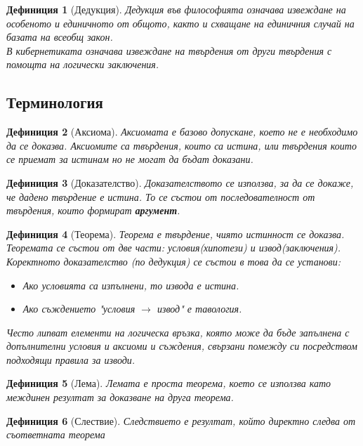 \documentclass[fleqn, 12pt]{article}
\newtheorem{definition}{Дефиниция}[subsection]
\begin{document}
\begin{definition}[Дедукция]
Дедукция във философията означава извеждане на особеното и единичното от общото, както и схващане на единичния случай на базата на всеобщ закон. \\
В кибернетиката означава извеждане на твърдения от други твърдения с помощта на логически заключения.
\end{definition}

\subsection{Терминология}

\begin{definition}[Аксиома]
Аксиомата е базово допускане, което не е необходимо да се доказва. 
Аксиомите са твърдения, които са истина, или твърдения които се приемат за истинам но не могат да бъдат доказани. 
\end{definition}

\begin{definition}[Доказателство]
Доказателството се използва, за да се докаже, че дадено твърдение е истина. То се състои от последователност от твърдения, които формират \textbf{аргумент}.
\end{definition}

\begin{definition}[Теорема]
Теорема е твърдение, чиято истинност се доказва. \\
Теоремата се състои от две части: условия(хипотези) и  извод(заключения). \\
Коректното доказателство (по дедукция) се състои в това да се установи: 
\begin{itemize}
	\item Ако условията са изпълнени, то извода е истина.
	\item Ако съждението "условия $\rightarrow$ извод" е тавология.
\end{itemize}
Често липват елементи на логическа връзка, която може да бъде запълнена с допълнителни условия и аксиоми и съждения, свързани помежду си посредством подходящи правила за изводи. 
\end{definition}

\begin{definition}[Лема]
Лемата е проста теорема, което се използва като междинен резултат за доказване на друга теорема. 
\end{definition}

\begin{definition}[Слествие]
Следствието е резултат, който директно следва от съответната теорема
\end{definition}
\end{document}
